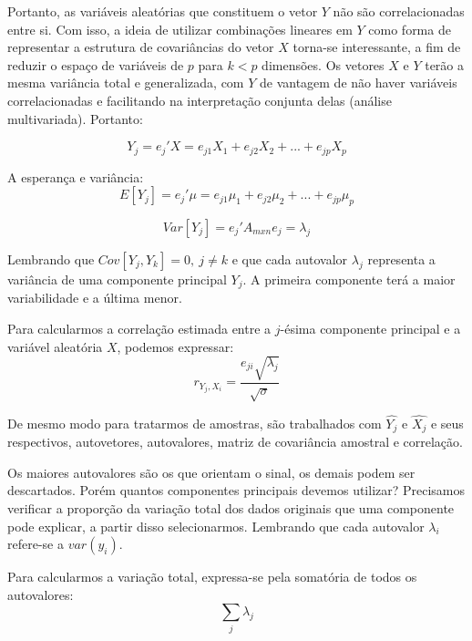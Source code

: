 \documentclass[
]{book}
\begin{document}
Portanto, as variáveis aleatórias que constituem o vetor \(Y\) não são correlacionadas entre si. Com isso, a ideia de utilizar combinações lineares em \(Y\) como forma de representar a estrutura de covariâncias do vetor \(X\) torna-se interessante, a fim de reduzir o espaço de variáveis de \(p\) para \(k<p\) dimensões. Os vetores \(X\) e \(Y\) terão a mesma variância total e generalizada, com \(Y\) de vantagem de não haver variáveis correlacionadas e facilitando na interpretação conjunta delas (análise multivariada). Portanto:

\begin{equation}
   Y_j=e_j'X=e_{j1}X_1+e_{j2}X_2+...+e_{jp}X_p
   \label{eq:cp}
\end{equation}

A esperança e variância:
\begin{equation}
E[Y_j]=e_j'\mu=e_{j1}\mu_1+e_{j2}\mu_2+...+e_{jp}\mu_p
\end{equation}

\begin{equation}     
Var[Y_j]=e_j' A_{mxn}e_j=\lambda_j
\end{equation}

Lembrando que \(Cov[Y_j,Y_k]=0, \ j\neq k\) e que cada autovalor \(\lambda_j\) representa a variância de uma componente principal \(Y_j\). A primeira componente terá a maior variabilidade e a última menor.

Para calcularmos a correlação estimada entre a \(j\)-ésima componente principal e a variável aleatória \(X\), podemos expressar:
\begin{equation}   
r_{Y_j,X_i}=\frac{e_{ji}\sqrt{\lambda_j}}{\sqrt{\sigma}}
\end{equation}

De mesmo modo para tratarmos de amostras, são trabalhados com \(\hat{Y_j}\) e \(\hat{X_j}\) e seus respectivos, autovetores, autovalores, matriz de covariância amostral e correlação.

Os maiores autovalores são os que orientam o sinal, os demais podem ser descartados. Porém quantos componentes principais devemos utilizar? Precisamos verificar a proporção da variação total dos dados originais que uma componente pode explicar, a partir disso selecionarmos. Lembrando que cada autovalor \(\lambda_i\) refere-se a \(var(y_i)\).

Para calcularmos a variação total, expressa-se pela somatória de todos os autovalores:
\begin{equation}
    \displaystyle \sum_j \lambda_j 
    \label{eq:vartot}
\end{equation}
\end{document}
